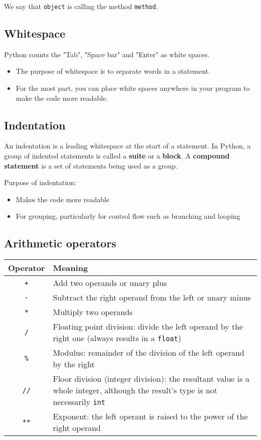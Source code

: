 \documentclass[11pt]{article}
\begin{document}
 \noindent We say that \texttt{object} is calling the method \texttt{method}.


\subsection{Whitespace}
\label{sec:org8439d83}
Python counts the "Tab", "Space bar" and "Enter" as white spaces.
\begin{itemize}
\item The purpose of whitespace is to separate words in a statement.
\item For the most part, you can place white spaces anywhere in your program to make the code more readable.
\end{itemize}

\subsection{Indentation}
\label{sec:org5a38bdc}
An indentation is a leading whitespace at the start of a statement. In Python, a group of indented statements is called a \textbf{suite} or a \textbf{block}. A \textbf{compound statement} is a set of statements being used as a group.

Purpose of indentation:
\begin{itemize}
\item Makes the code more readable
\item For grouping, particularly for control flow such as branching and looping
\end{itemize}

\subsection{Arithmetic operators}
\label{sec:orgefe1281}

\begin{center}
\begin{tabular}{|c|m{32em}|}
\hline
Operator & Meaning\\[0pt]
\hline
\texttt{+} & Add two operands or unary plus\\[0pt]
\hline
\texttt{-} & Subtract the right operand from the left or unary minus\\[0pt]
\hline
\texttt{*} & Multiply two operands\\[0pt]
\hline
\texttt{/} & Floating point division: divide the left operand by the right one (always results in a \texttt{float})\\[0pt]
\hline
\texttt{\%} & Modulus: remainder of the division of the left operand by the right\\[0pt]
\hline
\texttt{//} & Floor division (integer division): the resultant value is a whole integer, although the result's type is not necessarily \texttt{int}\\[0pt]
\hline
\texttt{**} & Exponent: the left operant is raised to the power of the right operand\\[0pt]
\hline
\end{tabular}
\end{center}
\end{document}
